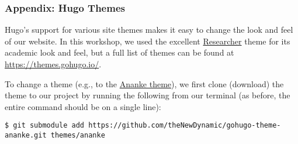 \begin{frame}[fragile]
    \frametitle{Appendix: Hugo Themes}

    Hugo's support for various site themes makes it easy to change the look and feel of our website.
    In this workshop, we used the excellent \href{https://themes.gohugo.io/themes/hugo-researcher/}{Researcher} theme
    for its academic look and feel, but a full list of themes can be found at \url{https://themes.gohugo.io/}.

    \vfill

    To change a theme (e.g., to the \href{https://themes.gohugo.io/themes/gohugo-theme-ananke/}{Ananke theme}), we
    first clone (download) the theme to our project by running the following from our terminal (as before, the entire 
    command should be on a single line):

    \vfill

    \begin{lstlisting}[style=saneCode,gobble=8]
        $ git submodule add https://github.com/theNewDynamic/gohugo-theme-ananke.git themes/ananke
    \end{lstlisting}
\end{frame}